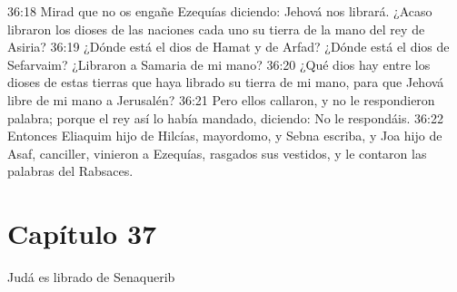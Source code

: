 36:18 Mirad que no os engañe Ezequías diciendo: Jehová nos librará. ¿Acaso libraron los dioses de las naciones cada uno su tierra de la mano del rey de Asiria? 
36:19 ¿Dónde está el dios de Hamat y de Arfad? ¿Dónde está el dios de Sefarvaim? ¿Libraron a Samaria de mi mano? 
36:20 ¿Qué dios hay entre los dioses de estas tierras que haya librado su tierra de mi mano, para que Jehová libre de mi mano a Jerusalén? 
36:21 Pero ellos callaron, y no le respondieron palabra; porque el rey así lo había mandado, diciendo: No le respondáis. 
36:22 Entonces Eliaquim hijo de Hilcías, mayordomo, y Sebna escriba, y Joa hijo de Asaf, canciller, vinieron a Ezequías, rasgados sus vestidos, y le contaron las palabras del Rabsaces. 
\section*{Capítulo 37 }
Judá es librado de Senaquerib 

